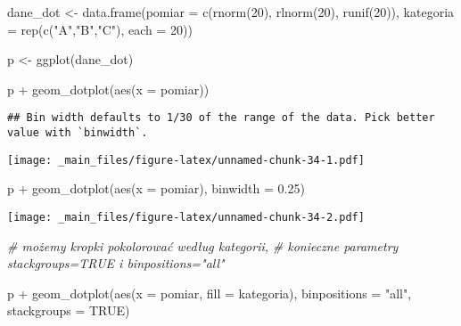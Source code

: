 \documentclass[
]{book}
\newenvironment{Shaded}{\begin{snugshade}}{\end{snugshade}}
\newcommand{\AttributeTok}[1]{\textcolor[rgb]{0.77,0.63,0.00}{#1}}
\newcommand{\CommentTok}[1]{\textcolor[rgb]{0.56,0.35,0.01}{\textit{#1}}}
\newcommand{\ConstantTok}[1]{\textcolor[rgb]{0.00,0.00,0.00}{#1}}
\newcommand{\DecValTok}[1]{\textcolor[rgb]{0.00,0.00,0.81}{#1}}
\newcommand{\FloatTok}[1]{\textcolor[rgb]{0.00,0.00,0.81}{#1}}
\newcommand{\FunctionTok}[1]{\textcolor[rgb]{0.00,0.00,0.00}{#1}}
\newcommand{\NormalTok}[1]{#1}
\newcommand{\OtherTok}[1]{\textcolor[rgb]{0.56,0.35,0.01}{#1}}
\newcommand{\SpecialCharTok}[1]{\textcolor[rgb]{0.00,0.00,0.00}{#1}}
\newcommand{\StringTok}[1]{\textcolor[rgb]{0.31,0.60,0.02}{#1}}
\begin{document}
\begin{Shaded}
\begin{Highlighting}[]
\NormalTok{dane\_dot }\OtherTok{\textless{}{-}} \FunctionTok{data.frame}\NormalTok{(}\AttributeTok{pomiar =} \FunctionTok{c}\NormalTok{(}\FunctionTok{rnorm}\NormalTok{(}\DecValTok{20}\NormalTok{), }\FunctionTok{rlnorm}\NormalTok{(}\DecValTok{20}\NormalTok{), }\FunctionTok{runif}\NormalTok{(}\DecValTok{20}\NormalTok{)), }
                       \AttributeTok{kategoria =} \FunctionTok{rep}\NormalTok{(}\FunctionTok{c}\NormalTok{(}\StringTok{"A"}\NormalTok{,}\StringTok{"B"}\NormalTok{,}\StringTok{"C"}\NormalTok{), }\AttributeTok{each =} \DecValTok{20}\NormalTok{))}

\NormalTok{p }\OtherTok{\textless{}{-}} \FunctionTok{ggplot}\NormalTok{(dane\_dot)}

\NormalTok{p }\SpecialCharTok{+} \FunctionTok{geom\_dotplot}\NormalTok{(}\FunctionTok{aes}\NormalTok{(}\AttributeTok{x =}\NormalTok{ pomiar))}
\end{Highlighting}
\end{Shaded}

\begin{verbatim}
## Bin width defaults to 1/30 of the range of the data. Pick better value with `binwidth`.
\end{verbatim}

\texttt{[image: \_main\_files/figure-latex/unnamed-chunk-34-1.pdf]}

\begin{Shaded}
\begin{Highlighting}[]
\NormalTok{p }\SpecialCharTok{+} \FunctionTok{geom\_dotplot}\NormalTok{(}\FunctionTok{aes}\NormalTok{(}\AttributeTok{x =}\NormalTok{ pomiar), }\AttributeTok{binwidth =} \FloatTok{0.25}\NormalTok{)}
\end{Highlighting}
\end{Shaded}

\texttt{[image: \_main\_files/figure-latex/unnamed-chunk-34-2.pdf]}

\begin{Shaded}
\begin{Highlighting}[]
\CommentTok{\# możemy kropki pokolorować według kategorii, }
\CommentTok{\# konieczne parametry stackgroups=TRUE i binpositions="all"}

\NormalTok{p }\SpecialCharTok{+} \FunctionTok{geom\_dotplot}\NormalTok{(}\FunctionTok{aes}\NormalTok{(}\AttributeTok{x =}\NormalTok{ pomiar, }\AttributeTok{fill =}\NormalTok{ kategoria), }\AttributeTok{binpositions =} \StringTok{"all"}\NormalTok{, }\AttributeTok{stackgroups =} \ConstantTok{TRUE}\NormalTok{)}
\end{Highlighting}
\end{Shaded}
\end{document}

